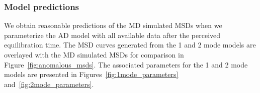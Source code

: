 \documentclass[aps,pre,preprint,groupedaddress]{revtex4-2}
\begin{document}
  
  

  \subsubsection{Model predictions}\label{section:AD_all_data}
 
  We obtain reasonable predictions of the MD simulated MSDs when we parameterize the AD 
  model with all available data after the perceived equilibration time. 
  The MSD curves generated from the 1 and 2 mode models are overlayed with the MD 
  simulated MSDs for comparison in Figure~\ref{fig:anomalous_msds}. The associated 
  parameters for the 1 and 2 mode models are presented in Figures~\ref{fig:1mode_parameters}
  and~\ref{fig:2mode_parameters}.
  
\end{document}
